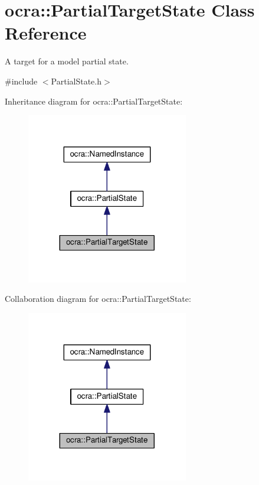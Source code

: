 \hypertarget{classocra_1_1PartialTargetState}{}\section{ocra\+:\+:Partial\+Target\+State Class Reference}
\label{classocra_1_1PartialTargetState}


A target for a model partial state.  




{\ttfamily \#include $<$Partial\+State.\+h$>$}



Inheritance diagram for ocra\+:\+:Partial\+Target\+State\+:
\nopagebreak
\begin{figure}[H]
\begin{center}
\leavevmode
\includegraphics[width=200pt]{de/dc1/classocra_1_1PartialTargetState__inherit__graph}
\end{center}
\end{figure}


Collaboration diagram for ocra\+:\+:Partial\+Target\+State\+:
\nopagebreak
\begin{figure}[H]
\begin{center}
\leavevmode
\includegraphics[width=200pt]{d5/d19/classocra_1_1PartialTargetState__coll__graph}
\end{center}
\end{figure}
